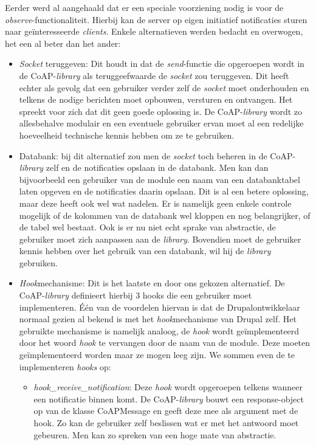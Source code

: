 Eerder werd al aangehaald dat er een speciale voorziening nodig is voor de \textit{observe}-functionaliteit. Hierbij kan de server op eigen initiatief notificaties sturen naar ge\"{i}nteresseerde \textit{clients}. Enkele alternatieven werden bedacht en overwogen, het een al beter dan het ander:
\begin{itemize}
\item \textit{Socket} teruggeven: Dit houdt in dat de \textit{send}-functie die opgeroepen wordt in de CoAP-\textit{library} als teruggeefwaarde de \textit{socket} zou teruggeven. Dit heeft echter als gevolg dat een gebruiker verder zelf de \textit{socket} moet onderhouden en telkens de nodige berichten moet opbouwen, versturen en ontvangen. Het spreekt voor zich dat dit geen goede oplossing is. De CoAP-\textit{library} wordt zo allesbehalve modulair en een eventuele gebruiker ervan moet al een redelijke hoeveelheid technische kennis hebben om ze te gebruiken.
\item Databank: bij dit alternatief zou men de \textit{socket} toch beheren in de CoAP-\textit{library} zelf en de notificaties opslaan in de databank. Men kan dan bijvoorbeeld een gebruiker van de module een naam van een databanktabel laten opgeven en de notificaties daarin opslaan. Dit is al een betere oplossing, maar deze heeft ook wel wat nadelen. Er is namelijk geen enkele controle mogelijk of de kolommen van de databank wel kloppen en nog belangrijker, of de tabel wel bestaat. Ook is er nu niet echt sprake van abstractie, de gebruiker moet zich aanpassen aan de \textit{library}. Bovendien moet de gebruiker kennis hebben over het gebruik van een databank, wil hij de \textit{library} gebruiken.
\item \textit{Hook}mechanisme: Dit is het laatste en door ons gekozen alternatief. De CoAP-\textit{library} definieert hierbij 3 hooks die een gebruiker moet implementeren. \'{E}\'{e}n van de voordelen hiervan is dat de Drupalontwikkelaar normaal gezien al bekend is met het \textit{hook}mechanisme van Drupal zelf. Het gebruikte mechanisme is namelijk analoog, de \textit{hook} wordt ge\"{i}mplementeerd door het woord \textit{hook} te vervangen door de naam van de module. Deze moeten ge\"{i}mplementeerd worden maar ze mogen leeg zijn. We sommen even de te implementeren \textit{hooks} op:
\begin{itemize}
\item \textit{hook\_receive\_notification}: Deze \textit{hook} wordt opgeroepen telkens wanneer een notificatie binnen komt. De CoAP-\textit{library} bouwt een response-object op van de klasse CoAPMessage en geeft deze mee als argument met de hook. Zo kan de gebruiker zelf beslissen wat er met het antwoord moet gebeuren. Men kan zo spreken van een hoge mate van abstractie.

\end{itemize}
\end{itemize}
